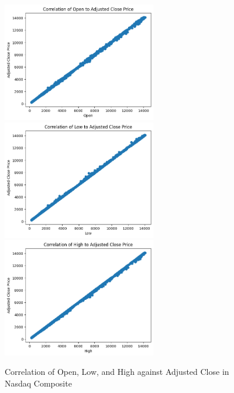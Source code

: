 \documentclass[a4paper, 11pt]{article}
\begin{document}
\begin{figure}[H]
    \begin{center}
        \includegraphics[width=0.6\textwidth]{Correlation of Open to Adjusted Close Price.png}
        \includegraphics[width=0.6\textwidth]{Correlation of Low to Adjusted Close Price.png}
        \includegraphics[width=0.6\textwidth]{Correlation of High to Adjusted Close Price.png}
        \caption{Correlation of Open, Low, and High against Adjusted Close in Nasdaq Composite}
    \end{center}
\end{figure}
\end{document}
